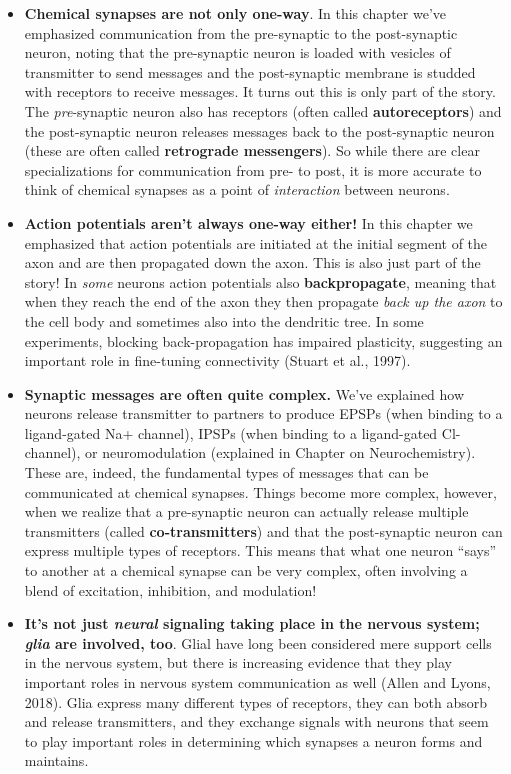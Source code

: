 \documentclass[
]{book}
\providecommand{\tightlist}{%
  \setlength{\itemsep}{0pt}\setlength{\parskip}{0pt}}
\begin{document}
\begin{itemize}
\tightlist
\item
  \textbf{Chemical synapses are not only one-way}. In this chapter we've emphasized communication from the pre-synaptic to the post-synaptic neuron, noting that the pre-synaptic neuron is loaded with vesicles of transmitter to send messages and the post-synaptic membrane is studded with receptors to receive messages. It turns out this is only part of the story. The \emph{pre}-synaptic neuron also has receptors (often called \textbf{autoreceptors}) and the post-synaptic neuron releases messages back to the post-synaptic neuron (these are often called \textbf{retrograde messengers}). So while there are clear specializations for communication from pre- to post, it is more accurate to think of chemical synapses as a point of \emph{interaction} between neurons.
\item
  \textbf{Action potentials aren't always one-way either!} In this chapter we emphasized that action potentials are initiated at the initial segment of the axon and are then propagated down the axon. This is also just part of the story! In \emph{some} neurons action potentials also \textbf{backpropagate}, meaning that when they reach the end of the axon they then propagate \emph{back up the axon} to the cell body and sometimes also into the dendritic tree. In some experiments, blocking back-propagation has impaired plasticity, suggesting an important role in fine-tuning connectivity (Stuart et al., 1997).
\item
  \textbf{Synaptic messages are often quite complex. }We've explained how neurons release transmitter to partners to produce EPSPs (when binding to a ligand-gated Na+ channel), IPSPs (when binding to a ligand-gated Cl- channel), or neuromodulation (explained in Chapter on Neurochemistry). These are, indeed, the fundamental types of messages that can be communicated at chemical synapses. Things become more complex, however, when we realize that a pre-synaptic neuron can actually release multiple transmitters (called \textbf{co-transmitters}) and that the post-synaptic neuron can express multiple types of receptors. This means that what one neuron ``says'' to another at a chemical synapse can be very complex, often involving a blend of excitation, inhibition, and modulation!
\item
  \textbf{It's not just \emph{neural} signaling taking place in the nervous system; \emph{glia} are involved, too}. Glial have long been considered mere support cells in the nervous system, but there is increasing evidence that they play important roles in nervous system communication as well (Allen and Lyons, 2018). Glia express many different types of receptors, they can both absorb and release transmitters, and they exchange signals with neurons that seem to play important roles in determining which synapses a neuron forms and maintains.\\

\end{itemize}
\end{document}
